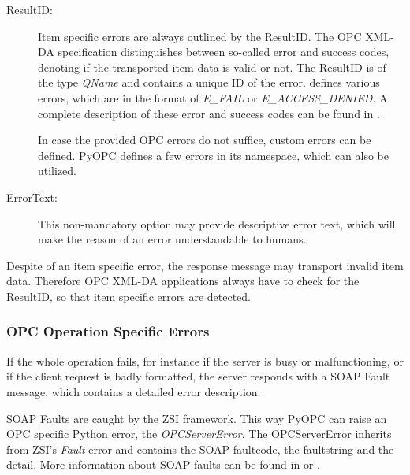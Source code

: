 \begin{description}
\item[ResultID:] Item specific errors are always outlined by the
ResultID. The OPC XML-DA specification distinguishes between so-called
error and success codes, denoting if the transported item data is
valid or not. The ResultID is of the type {\sl QName} and contains a
unique ID of the error. \cite{OPCXMLDA} defines various errors, which
are in the format of {\sl E\_FAIL} or {\sl E\_ACCESS\_DENIED}.  A
complete description of these error and success codes can be found in
\cite{OPCXMLDA}.

In case the provided OPC errors do not suffice, custom errors can be
defined. PyOPC defines a few errors in its namespace, which can also
be utilized.

\item[ErrorText:] This non-mandatory option may provide descriptive
error text, which will make the reason of an error understandable to
humans.

\end{description}

Despite of an item specific error, the response message may transport
invalid item data. Therefore OPC XML-DA applications always have to
check for the ResultID, so that item specific errors are detected.

\subsubsection*{OPC Operation Specific Errors}

If the whole operation fails, for instance if the server is busy or
malfunctioning, or if the client request is badly formatted, the
server responds with a SOAP Fault message, which contains a detailed
error description.

SOAP Faults are caught by the ZSI framework. This way PyOPC can raise
an OPC specific Python error, the {\sl OPCServerError}. The
OPCServerError inherits from ZSI's {\sl Fault} error and contains the
SOAP faultcode, the faultstring and the detail. More information about
SOAP faults can be found in \cite{SOAP1} or \cite{SOAP2}.

\thispagestyle{plain}
